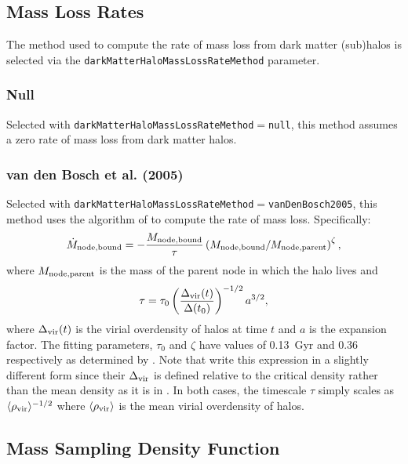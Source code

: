 \subsection{Mass Loss Rates}

The method used to compute the rate of mass loss from dark matter (sub)halos is selected via the {\tt darkMatterHaloMassLossRateMethod} parameter.

\subsubsection{Null}

Selected with {\tt darkMatterHaloMassLossRateMethod}$=${\tt null}, this method assumes a zero rate of mass loss from dark matter halos.

\subsubsection{van den Bosch et al. (2005)}

Selected with {\tt darkMatterHaloMassLossRateMethod}$=${\tt vanDenBosch2005}, this method uses the algorithm of \cite{van_den_bosch_mass_2005} to compute the rate of mass loss. Specifically:
\begin{equation}
\dot{M}_{\rm node,bound} = -{M_{\rm node,bound}\over \tau} \left({M_{\rm node,bound} / M_{\rm node,parent}}\right)^\zeta,
\end{equation}
where $M_{\rm node,parent}$ is the mass of the parent \gls{node} in which the halo lives and
\begin{equation}
\tau = \tau_0 \left({\Delta_{\rm vir}(t) \over \Delta(t_0)}\right)^{-1/2} a^{3/2},
\end{equation}
where $\Delta_{\rm vir}(t)$ is the virial overdensity of halos at time $t$ and $a$ is the expansion factor. The fitting parameters, $\tau_0$ and $\zeta$ have values of 0.13~Gyr and 0.36 respectively as determined by \cite{van_den_bosch_mass_2005}. Note that  \cite{van_den_bosch_mass_2005} write this expression in a slightly different form since their $\Delta_{\rm vir}$ is defined relative to the critical density rather than the mean density as it is in \glc. In both cases, the timescale $\tau$ simply scales as $\langle \rho_{\rm vir} \rangle ^{-1/2}$ where $\langle \rho_{\rm vir} \rangle$ is the mean virial overdensity of halos.

\subsection{Mass Sampling Density Function}\label{sec:MassSamplingDensityFunction}

